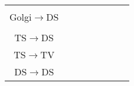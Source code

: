\begin{longtable}{cXXXXXXX}
                                 &                                                  &                                                                                                                    &                                                           &                                           &                                                                                             &                                           & \\ 
Golgi\ensuremath{\rightarrow}DS  &                                                  &                                                                                                                    &                                                           &                                           &                                                                                             &                                           & \\\midrule
                                 &                                                  &                                                                                                                    &                                                           &                                           &                                                                                             &                                           & \\
  TS\ensuremath{\rightarrow}DS   &                                                  &                                                                                                                    &                                                           &                                           &                                                                                             &                                           & \\ 
  TS\ensuremath{\rightarrow}TV   &                                                  &                                                                                                                    &                                                           &                                           &                                                                                             &                                           & \\ 
  DS\ensuremath{\rightarrow}DS   &                                                  &                                                                                                                    &                                                           &                                           &                                                                                             &                                           & \\ 

\end{longtable}
